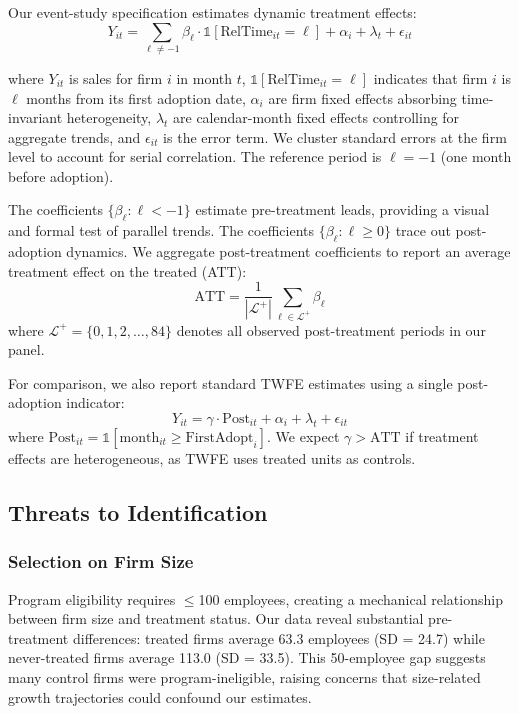 \documentclass{article}
\begin{document}
Our event-study specification estimates dynamic treatment effects:
\begin{equation}
Y_{it} = \sum_{\ell \neq -1} \beta_\ell \cdot \mathbb{1}[\text{RelTime}_{it} = \ell] + \alpha_i + \lambda_t + \epsilon_{it}
\label{eq:event_study}
\end{equation}

where $Y_{it}$ is sales for firm $i$ in month $t$, $\mathbb{1}[\text{RelTime}_{it} = \ell]$ indicates that firm $i$ is $\ell$ months from its first adoption date, $\alpha_i$ are firm fixed effects absorbing time-invariant heterogeneity, $\lambda_t$ are calendar-month fixed effects controlling for aggregate trends, and $\epsilon_{it}$ is the error term. We cluster standard errors at the firm level to account for serial correlation. The reference period is $\ell = -1$ (one month before adoption).

The coefficients $\{\beta_\ell : \ell < -1\}$ estimate pre-treatment leads, providing a visual and formal test of parallel trends. The coefficients $\{\beta_\ell : \ell \geq 0\}$ trace out post-adoption dynamics. We aggregate post-treatment coefficients to report an average treatment effect on the treated (ATT):
\begin{equation}
\text{ATT} = \frac{1}{|\mathcal{L}^+|} \sum_{\ell \in \mathcal{L}^+} \beta_\ell
\label{eq:att}
\end{equation}
where $\mathcal{L}^+ = \{0, 1, 2, \ldots, 84\}$ denotes all observed post-treatment periods in our panel.

For comparison, we also report standard TWFE estimates using a single post-adoption indicator:
\begin{equation}
Y_{it} = \gamma \cdot \text{Post}_{it} + \alpha_i + \lambda_t + \epsilon_{it}
\label{eq:twfe}
\end{equation}
where $\text{Post}_{it} = \mathbb{1}[\text{month}_{it} \geq \text{FirstAdopt}_i]$. We expect $\gamma > \text{ATT}$ if treatment effects are heterogeneous, as TWFE uses treated units as controls.

\subsection{Threats to Identification}

\subsubsection{Selection on Firm Size}

Program eligibility requires $\leq$100 employees, creating a mechanical relationship between firm size and treatment status. Our data reveal substantial pre-treatment differences: treated firms average 63.3 employees (SD = 24.7) while never-treated firms average 113.0 (SD = 33.5). This 50-employee gap suggests many control firms were program-ineligible, raising concerns that size-related growth trajectories could confound our estimates.
\end{document}
